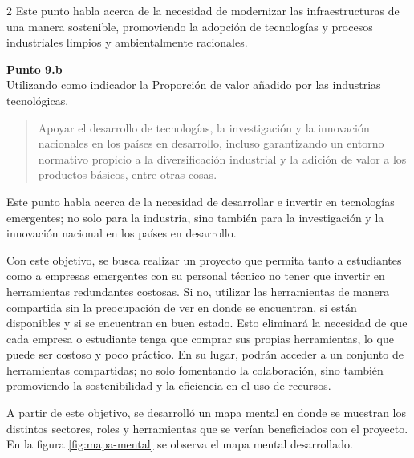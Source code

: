 \begin{multicols*}{2}
Este punto habla acerca de la necesidad de modernizar las infraestructuras de una manera sostenible, promoviendo la adopción de tecnologías y procesos industriales limpios y ambientalmente racionales. 

\vspace{0.5 em}

\textbf{Punto 9.b} \\ 
Utilizando como indicador la Proporción de valor añadido por las industrias tecnológicas. 

\begin{quote}
Apoyar el desarrollo de tecnologías, la investigación y la innovación nacionales en los países en desarrollo, incluso garantizando un entorno normativo propicio a la diversificación industrial y la adición de valor a los productos básicos, entre otras cosas.
\end{quote}

Este punto habla acerca de la necesidad de desarrollar e invertir en tecnologías emergentes; no solo para la industria, sino también para la investigación y la innovación nacional en los países en desarrollo.

\vspace{0.5 em}

Con este objetivo, se busca realizar un proyecto que permita tanto a estudiantes como a empresas emergentes con su personal técnico no tener que invertir en herramientas redundantes costosas. Si no, utilizar las herramientas de manera compartida sin la preocupación de ver en donde se encuentran, si están disponibles y si se encuentran en buen estado. Esto eliminará la necesidad de que cada empresa o estudiante tenga que comprar sus propias herramientas, lo que puede ser costoso y poco práctico. En su lugar, podrán acceder a un conjunto de herramientas compartidas; no solo fomentando la colaboración, sino también promoviendo la sostenibilidad y la eficiencia en el uso de recursos.

\vspace{0.5 em}

A partir de este objetivo, se desarrolló un mapa mental en donde se muestran los distintos sectores, roles y herramientas que se verían beneficiados con el proyecto. En la figura \ref{fig:mapa-mental} se observa el mapa mental desarrollado. 
\end{multicols*}

